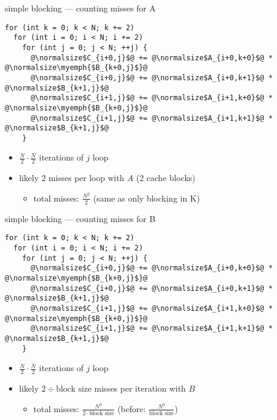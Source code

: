 \begin{frame}[fragile,label=cacheBlockExamplePartialMissesA]{simple blocking --- counting misses for A}
\lstset{style=small,language=C,escapechar=@}
\begin{lstlisting}
for (int k = 0; k < N; k += 2)
  for (int i = 0; i < N; i += 2)
    for (int j = 0; j < N; ++j) {
      @\normalsize$C_{i+0,j}$@ += @\normalsize$A_{i+0,k+0}$@ * @\normalsize\myemph{$B_{k+0,j}$}@
      @\normalsize$C_{i+0,j}$@ += @\normalsize$A_{i+0,k+1}$@ * @\normalsize$B_{k+1,j}$@
      @\normalsize$C_{i+1,j}$@ += @\normalsize$A_{i+1,k+0}$@ * @\normalsize\myemph{$B_{k+0,j}$}@
      @\normalsize$C_{i+1,j}$@ += @\normalsize$A_{i+1,k+1}$@ * @\normalsize$B_{k+1,j}$@
    }
\end{lstlisting}
\begin{itemize}
\item $\frac{N}{2}\cdot\frac{N}{2}$ iterations of $j$ loop
\item likely 2 misses per loop with $A$ (2 cache blocks)
    \begin{itemize}
    \item total misses: $\frac{N^2}{2}$ (same as only blocking in K)
    \end{itemize}
\end{itemize}
\end{frame}

\begin{frame}[fragile,label=cacheBlockExamplePartialMissesB]{simple blocking --- counting misses for B}
\lstset{style=small,language=C,escapechar=@}
\begin{lstlisting}
for (int k = 0; k < N; k += 2)
  for (int i = 0; i < N; i += 2)
    for (int j = 0; j < N; ++j) {
      @\normalsize$C_{i+0,j}$@ += @\normalsize$A_{i+0,k+0}$@ * @\normalsize\myemph{$B_{k+0,j}$}@
      @\normalsize$C_{i+0,j}$@ += @\normalsize$A_{i+0,k+1}$@ * @\normalsize$B_{k+1,j}$@
      @\normalsize$C_{i+1,j}$@ += @\normalsize$A_{i+1,k+0}$@ * @\normalsize\myemph{$B_{k+0,j}$}@
      @\normalsize$C_{i+1,j}$@ += @\normalsize$A_{i+1,k+1}$@ * @\normalsize$B_{k+1,j}$@
    }
\end{lstlisting}
\begin{itemize}
\item $\frac{N}{2}\cdot\frac{N}{2}$ iterations of $j$ loop
\item likely $2\div\text{block size}$ misses per iteration with $B$
    \begin{itemize}
    \item total misses: $\frac{N^3}{2\cdot\text{block size}}$ (before: $\frac{N^3}{\text{block size}}$)
    \end{itemize}
\end{itemize}
\end{frame}

